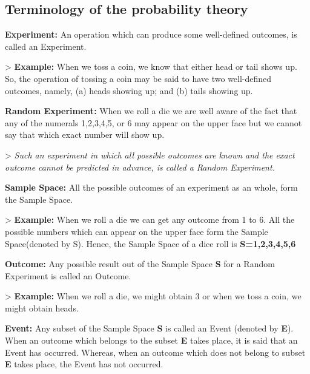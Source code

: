 \subsection{Terminology of the probability theory}
\label{sss:term-abc8}




\textbf{Experiment:} An operation which can produce some well-defined outcomes, is called an Experiment.



> \textbf{Example:} When we toss a coin, we know that either head or tail shows up. So,
the operation of tossing a coin may be said to have two well-defined outcomes, namely, (a)
heads showing up; and (b) tails showing up.



\textbf{Random Experiment:} When we roll a die we are well aware of the fact that any of the numerals 1,2,3,4,5, or 6 may appear on the upper face but we cannot say that which exact number will show up.



> \textit{Such an experiment in which all possible outcomes are known and the exact
outcome cannot be predicted in advance, is called a Random Experiment.}



\textbf{Sample Space:} All the possible outcomes of an experiment as an whole, form the Sample Space.



> \textbf{Example:} When we roll a die we can get any outcome from 1 to 6. All the
possible numbers which can appear on the upper face form the Sample Space(denoted by S).
Hence, the Sample Space of a dice roll is \textbf{S={1,2,3,4,5,6}}



\textbf{Outcome:} Any possible result out of the Sample Space \textbf{S} for a Random Experiment is called an Outcome.



> \textbf{Example:} When we roll a die, we might obtain 3 or when we toss a coin, we might
obtain heads.



\textbf{Event:} Any subset of the Sample Space \textbf{S} is called an Event (denoted by \textbf{E}). When an outcome which belongs to the subset \textbf{E} takes place, it is said that an Event has occurred. Whereas, when an outcome which does not belong to subset \textbf{E} takes place, the Event has not occurred.



